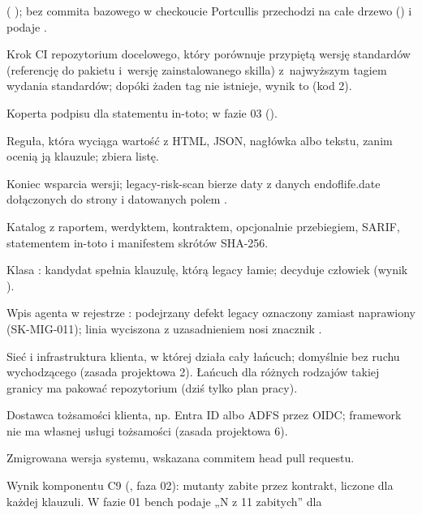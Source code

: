 \begin{description}[style=nextline, leftmargin=1.2em, font=\normalfont\bfseries]
        ( ); bez commita bazowego w checkoucie
        Portcullis przechodzi na całe drzewo () i podaje
        .
  \item[drift check] Krok CI repozytorium docelowego, który porównuje przypiętą wersję
        standardów (referencję do pakietu i~wersję zainstalowanego skilla) z~najwyższym tagiem
        wydania standardów; dopóki żaden tag nie istnieje, wynik to  (kod 2).
  \item[DSSE] Koperta podpisu dla statementu in-toto; w fazie 03 ().
  \item[ekstraktor] Reguła, która wyciąga wartość z HTML, JSON, nagłówka albo tekstu,
        zanim ocenią ją klauzule;  zbiera listę.
  \item[EOL] Koniec wsparcia wersji; legacy-risk-scan bierze daty z danych endoflife.date
        dołączonych do strony i datowanych polem .
  \item[evidence pack (pakiet dowodowy)] Katalog z raportem, werdyktem, kontraktem,
        opcjonalnie przebiegiem, SARIF, statementem in-toto i manifestem skrótów SHA-256.
  \item[fix candidate] Klasa : kandydat spełnia klauzulę, którą
        legacy łamie; decyduje człowiek (wynik ).
  \item[flaga zachowania] Wpis agenta w rejestrze :
        podejrzany defekt legacy oznaczony zamiast naprawiony (SK-MIG-011); linia wyciszona
        z uzasadnieniem nosi znacznik .
  \item[granica klienta] Sieć i infrastruktura klienta, w której działa cały łańcuch;
        domyślnie bez ruchu wychodzącego (zasada projektowa 2). Łańcuch dla różnych rodzajów
        takiej granicy ma pakować repozytorium 
        (dziś tylko plan pracy).
  \item[IdP] Dostawca tożsamości klienta, np. Entra ID albo ADFS przez OIDC; framework nie ma
        własnej usługi tożsamości (zasada projektowa 6).
  \item[kandydat] Zmigrowana wersja systemu, wskazana commitem head pull requestu.
  \item[kill rate] Wynik komponentu C9 (, faza 02): mutanty zabite przez
        kontrakt, liczone dla każdej klauzuli. W fazie 01 bench podaje „N z 11 zabitych” dla

\end{description}
